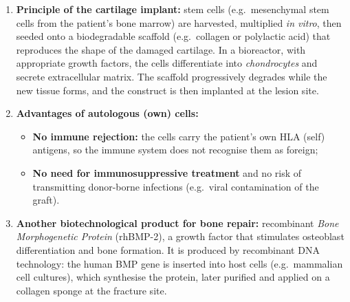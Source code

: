 \documentclass[11pt]{article}
\newcommand{\cle}[1]{{\popxbold\color{popdark}#1}}
\begin{document}
\begin{corrige}
\begin{enumerate}
\item \textbf{Principle of the cartilage implant:} stem cells (e.g.\ mesenchymal stem cells from the patient's bone marrow) are harvested, multiplied \emph{in vitro}, then seeded onto a \cle{biodegradable scaffold} (e.g.\ collagen or polylactic acid) that reproduces the shape of the damaged cartilage. In a bioreactor, with appropriate growth factors, the cells differentiate into \emph{chondrocytes} and secrete extracellular matrix. The scaffold progressively degrades while the new tissue forms, and the construct is then implanted at the lesion site.
\item \textbf{Advantages of autologous (own) cells:}
\begin{itemize}
\item \textbf{No immune rejection:} the cells carry the patient's own HLA (self) antigens, so the immune system does not recognise them as foreign;
\item \textbf{No need for immunosuppressive treatment} and no risk of transmitting donor-borne infections (e.g.\ viral contamination of the graft).
\end{itemize}
\item \textbf{Another biotechnological product for bone repair:} recombinant \emph{Bone Morphogenetic Protein} (rhBMP-2), a growth factor that stimulates osteoblast differentiation and bone formation. It is produced by recombinant DNA technology: the human BMP gene is inserted into host cells (e.g.\ mammalian cell cultures), which synthesise the protein, later purified and applied on a collagen sponge at the fracture site.
\end{enumerate}
\end{corrige}
\end{document}
